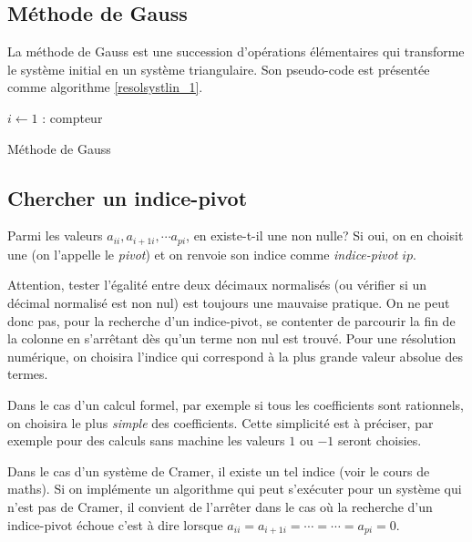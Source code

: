 \subsection{Méthode de Gauss}
La méthode de Gauss est une succession d'opérations élémentaires qui transforme le système initial en un système triangulaire. Son pseudo-code est présentée comme algorithme \ref{resolsystlin_1}.
\begin{algorithm}[h]
  $i\leftarrow 1$ : compteur\;
  \caption{Méthode de Gauss}
  \label{resolsystlin_1}
\end{algorithm}

\subsection{Chercher un indice-pivot}
Parmi les valeurs $a_{i i}, a_{i+1 i}, \cdots a_{p i}$, en existe-t-il une non nulle? Si oui, on en choisit une (on l'appelle le \emph{pivot}) et on renvoie son indice comme \emph{indice-pivot} $ip$.
\begin{rems}
  \item Attention, tester l'égalité entre deux décimaux normalisés (ou vérifier si un décimal normalisé est non nul) est toujours une mauvaise pratique. On ne peut donc pas, pour la recherche d'un indice-pivot, se contenter de parcourir la fin de la colonne en s'arrêtant dès qu'un terme non nul est trouvé. Pour une résolution numérique, on choisira l'indice qui correspond à la plus grande valeur absolue des termes.
  \item Dans le cas d'un calcul formel, par exemple si tous les coefficients sont rationnels, on choisira le plus \emph{simple} des coefficients. Cette simplicité est à préciser, par exemple pour des calculs sans machine les valeurs $1$ ou $-1$ seront choisies.
  \item Dans le cas d'un système de Cramer, il existe un tel indice (voir le cours de maths). Si on implémente un algorithme qui peut s'exécuter pour un système qui n'est pas de Cramer, il convient de l'arrêter dans le cas où la recherche d'un indice-pivot échoue c'est à dire lorsque $a_{i i} = a_{i+1 i} = \cdots = \cdots = a_{p i}=0$.  
\end{rems}

